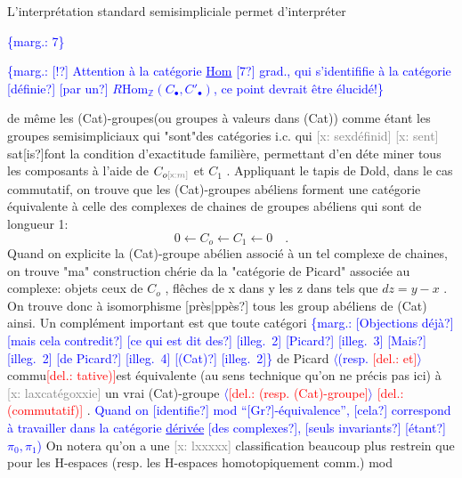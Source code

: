 \documentclass[11pt]{article}
\newcommand{\scanpage}[1]{\par\bigskip\noindent{\small\sffamily[scan #1]}\par}
\newcommand{\hand}[1]{\textcolor{blue}{#1}}
\newcommand{\inserted}[2][]{\textcolor{blue}{$\langle$#2$\rangle$}}
\newcommand{\margin}[1]{\textcolor{blue}{\{\textsf{marg.:} #1\}}}
\newcommand{\deleted}[1]{\textcolor{red}{[\textsf{del.:} #1]}}
\newcommand{\xout}[1]{\textcolor{gray}{[\textsf{x:} #1]}}
\newcommand{\uline}[1]{\underline{#1}}
\newcommand{\unsure}[1]{[#1?]}
\newcommand{\illegible}[1]{[\textsf{illeg.\ #1}]}
\begin{document}
L'interprétation standard semisimpliciale permet d'interpréter

\margin{7}

\clearpage
\scanpage{162-5/8}
\margin{\unsure{!} Attention à la catégorie \uline{Hom} \hand{\unsure{7}} grad., qui s'identififie à la catégorie \unsure{définie} \unsure{par un} $R\mathrm{Hom}_{\mathbb{Z}}(C_{\bullet}, C'_{\bullet})$, ce point devrait être élucidé!}

de même les (Cat)-groupes(ou groupes à valeurs dans (Cat)) comme étant
les groupes semisimpliciaux qui "sont"des catégories i.c. qui \xout{sexdéfinid}
\xout{sent} sat\unsure{is}font la condition d'exactitude familière, permettant d'en déte
miner tous les composants à l'aide de $C_{o\xout{m}}$ et $C_1$ . Appliquant le tapis de
Dold, dans le cas commutatif, on trouve que les (Cat)-groupes abéliens
forment une catégorie équivalente à celle des complexes de chaines de
groupes abéliens qui sont de longueur 1:
\[ 0 \leftarrow C_o \leftarrow C_1 \leftarrow 0 \quad . \]
Quand on explicite la (Cat)-groupe abélien associé à un tel complexe de
chaines, on trouve "ma" construction chérie da la "catégorie de Picard"
associée au complexe: objets ceux de $C_o$ , flêches de x dans y les z dans
tels que $dz = y-x$ . On trouve donc à isomorphisme \unsure{près|ppès} tous les group
abéliens de (Cat) ainsi. Un complément important est que toute catégori
\margin{\unsure{Objections déjà} \unsure{mais cela contredit} \unsure{ce qui est dit des} \illegible{2} \unsure{Picard} \illegible{3} \unsure{Mais} \illegible{2} \unsure{de Picard} \illegible{4} \unsure{(Cat)} \illegible{2}}
de Picard \inserted[typed]{(resp. \deleted{et}} commu\deleted{tative)}est équivalente (au sens technique qu'on ne précis
pas ici) à \xout{laxcatégoxxie} un vrai (Cat)-groupe \inserted[typed]{\deleted{(resp. (Cat)-groupe}} \deleted{(commutatif)} . \hand{Quand on}
\hand{\unsure{identifie} mod ``\unsure{Gr}-équivalence'', \unsure{cela} correspond à travailler dans la catégorie \uline{dérivée}}
\hand{\unsure{des complexes}, \unsure{seuls invariants} \unsure{étant} $\pi_0, \pi_1$)}
On notera qu'on a une \xout{lxxxxx} classification beaucoup plus restrein
que pour les H-espaces (resp. les H-espaces homotopiquement comm.) mod
\end{document}
